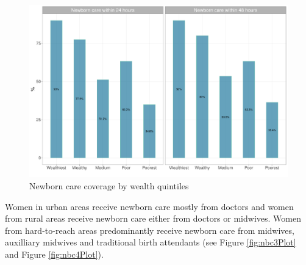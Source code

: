\documentclass[12pt,a4paper]{article}
\begin{document}
\begin{figure}[H]

{\centering \includegraphics{kayinReport_files/figure-latex/nbc2Plot-1} 

}

\caption{Newborn care coverage by wealth quintiles}\label{fig:nbc2Plot}
\end{figure}

Women in urban areas receive newborn care mostly from doctors and women from rural areas receive newborn care either from doctors or midwives. Women from hard-to-reach areas predominantly receive newborn care from midwives, auxilliary midwives and traditional birth attendants (see Figure \ref{fig:nbc3Plot} and Figure \ref{fig:nbc4Plot}).
\end{document}

